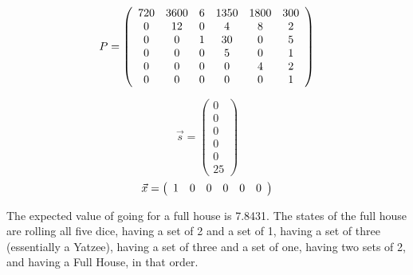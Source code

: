 \[
P=
\left(
\begin{array}{c c c c c c}
720 & 3600 & 6 & 1350 & 1800 & 300\\
0 & 12 & 0 & 4 & 8 & 2\\
0 & 0 & 1 & 30 & 0 & 5\\
0 & 0 & 0 & 5 & 0 & 1\\
0 & 0 & 0 & 0 & 4 & 2\\
0 & 0 & 0 & 0 & 0 & 1\\
\end{array}
\right)
\]

\[
\vec{s}=
\left(
\begin{array}{c}
0\\
0\\
0\\
0\\
0\\
25
\end{array}
\right)
\]
\[
\vec{x}=
\left(
\begin{array}{c c c c c c}
1&0&0&0&0&0
\end{array}
\right)
\]

The expected value of going for a full house is 7.8431. The states of the full house are rolling all five dice, having a set of 2 and a set of 1, having a set of three (essentially a Yatzee), having a set of three and a set of one, having two sets of 2, and having a Full House, in that order. 

